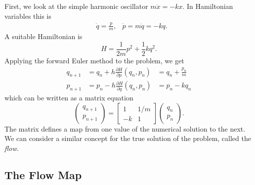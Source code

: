 First, we look at the simple harmonic oscillator $m \ddot{x} = -k x$.
In Hamiltonian variables this is
\begin{equation*}
	\begin{aligned}
		&\dot{q} = \frac{p}{m}, &\dot{p} = m\ddot{q} = -kq.
	\end{aligned}
\end{equation*}
A suitable Hamiltonian \cite{Casas_2016} is
\begin{equation*}
	H = \frac{1}{2m}p^2 + \frac{1}{2}kq^2.
\end{equation*}
Applying the forward Euler method to the problem, we get
\begin{equation*}
	\begin{aligned}
		q_{n+1} &= q_n + h\frac{\partial H}{\partial p}(q_n, p_n) &= q_n + \frac{p_n}{m}\\
		p_{n+1} &= p_n - h\frac{\partial H}{\partial q}(q_n, p_n) &= p_n - kq_n
	\end{aligned}
\end{equation*}
which can be written as a matrix equation
\begin{equation*}
	\begin{pmatrix}
		q_{n+1} \\
		p_{n+1}
	\end{pmatrix} = \begin{bmatrix}
		1 & 1/m \\
		-k & 1
	\end{bmatrix} \begin{pmatrix}
		q_n \\
		p_n
	\end{pmatrix}.
\end{equation*}
The matrix defines a map from one value of the numerical solution to the next.
We can consider a similar concept for the true solution of the problem, called the \textit{flow}.

\subsection{The Flow Map}

